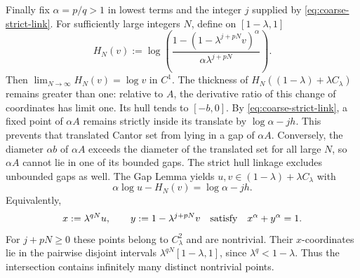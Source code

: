 Finally fix $\alpha=p/q>1$ in lowest terms and the integer $j$ supplied by
\eqref{eq:coarse-strict-link}. For sufficiently large integers $N$, define
on $[1-\lambda,1]$
\[
 H_N(v):=\log\left(
 \frac{1-(1-\lambda^{j+pN}v)^\alpha}
 {\alpha\lambda^{j+pN}}\right).
\]
Then $\displaystyle\lim_{N\to\infty}H_N(v)=\log v$ in $C^1$.
The thickness of $H_N((1-\lambda)+\lambda C_\lambda)$ remains greater than
one: relative to $A$, the derivative ratio of this change of coordinates
has limit one. Its hull tends to $[-b,0]$.
By \eqref{eq:coarse-strict-link}, a fixed point of $\alpha A$ remains
strictly inside its translate by $\log\alpha-jh$.
This prevents that translated Cantor set from lying in a gap of $\alpha A$.
Conversely, the diameter $\alpha b$ of $\alpha A$ exceeds the diameter of
the translated set for all large $N$, so $\alpha A$ cannot lie in one of
its bounded gaps. The strict hull linkage excludes unbounded gaps as well.
The Gap Lemma yields $u,v\in(1-\lambda)+\lambda C_\lambda$ with
\[
 \alpha\log u-H_N(v)=\log\alpha-jh.
\]
Equivalently,
\[
 x:=\lambda^{qN}u,\qquad y:=1-\lambda^{j+pN}v
 \quad\hbox{satisfy}\quad x^\alpha+y^\alpha=1.
\]
For $j+pN\ge0$ these points belong to $C_\lambda^2$ and are nontrivial.
Their $x$-coordinates lie in the pairwise disjoint intervals
$\lambda^{qN}[1-\lambda,1]$, since $\lambda^q<1-\lambda$.
Thus the intersection contains infinitely many distinct nontrivial points.
